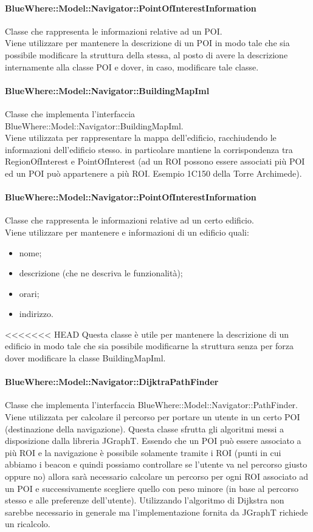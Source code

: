 \documentclass[../SpecificaTecnica.tex]{subfiles}
\begin{document}
				\paragraph{BlueWhere::Model::Navigator::PointOfInterestInformation}
					Classe che rappresenta le informazioni relative ad un POI. \\
					Viene utilizzare per mantenere la descrizione di un POI in modo tale che sia possibile modificare la struttura della stessa, al posto di avere la descrizione internamente alla classe POI e dover, in caso, modificare tale classe.
				\paragraph{BlueWhere::Model::Navigator::BuildingMapIml}
					Classe che implementa l'interfaccia BlueWhere::Model::Navigator::BuildingMapIml. \\
					Viene utilizzata per rappresentare la mappa dell'edificio, racchiudendo le informazioni dell'edificio stesso. in particolare mantiene la corrispondenza tra RegionOfInterest e PointOfInterest (ad un ROI possono essere associati più POI ed un POI può appartenere a più ROI. Esempio 1C150 della Torre Archimede).
				\paragraph{BlueWhere::Model::Navigator::PointOfInterestInformation}
					Classe che rappresenta le informazioni relative ad un certo edificio. \\
					Viene utilizzare per mantenere e informazioni di un edificio quali:
					\begin{itemize}
						\item nome;
						\item descrizione (che ne descriva le funzionalità);
						\item orari;
						\item indirizzo.
					\end{itemize}
<<<<<<< HEAD
					Questa classe è utile per mantenere la descrizione di un edificio in modo tale che sia possibile modificarne la struttura senza per forza dover modificare la classe BuildingMapIml. 
				\paragraph{BlueWhere::Model::Navigator::DijktraPathFinder}
					Classe che implementa l'interfaccia BlueWhere::Model::Navigator::PathFinder. \\
					Viene utilizzata per calcolare il percorso per portare un utente in un certo POI (destinazione della navigazione). Questa classe sfrutta gli algoritmi messi a disposizione dalla libreria JGraphT. Essendo che un POI può essere associato a più ROI e la navigazione è possibile solamente tramite i ROI (punti in cui abbiamo i beacon e quindi possiamo controllare se l'utente va nel percorso giusto oppure no) allora sarà necessario calcolare un percorso per ogni ROI associato ad un POI e successivamente scegliere quello con peso minore (in base al percorso stesso e alle preferenze dell'utente). Utilizzando l'algoritmo di Dijkstra non sarebbe necessario in generale ma l'implementazione fornita da JGraphT richiede un ricalcolo.
\end{document}
